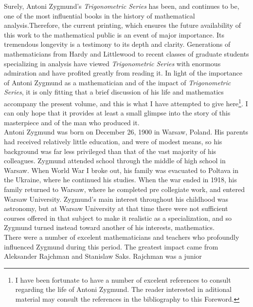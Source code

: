 %
%
Surely, Antoni Zygmund's \textit{Trigonometric Series} has been, and continues to be, one of the most influential 
books in the history of mathematical analysis.Therefore, the current printing, which ensures the future availability of 
this work to the mathematical public is an event of major importance. Its tremendous longevity is a testimony 
to its depth and clarity. Generations of mathematicians from Hardy and Littlewood to recent classes of graduate 
students specializing in analysis have viewed \textit{Trigonometric Series} with enormous admiration and have 
profited greatly from reading it. In light of the importance of Antoni Zygmund as a mathematician and of the 
impact of \textit{Trigonometric Series}, it is only fitting that a brief discussion of his life and mathematics accompany 
the present volume, and this is what I have attempted to give here\footnote[1]{I have been fortunate to have a number of 
excelent references to consult regarding the life of Antoni Zygmund. The reader interested in aditional material 
may consult the references in the bibliography to this Foreword.}. I can only hope that it provides at least 
a small glimpse into the story of this masterpiece and of the man who produced it.\\
\indent Antoni Zygmund was born on December 26, 1900 in Warsaw, Poland. His parents had received relatively 
little education, and were of modest means, so his background was far less privileged than that of the vast majority 
of his colleagues. Zygmund attended school through the middle of high school in Warsaw. When World War I broke 
out, his family was evacuated to Poltava in the Ukraine, where he continued his studies. When the war ended 
in 1918, his family returned to Warsaw, where he completed pre collegiate work, and entered Warsaw University. 
Zygmund's main interest throughout his childhood was astronomy, but at Warsaw University at that time there 
were not sufficient courses offered in that subject to make it realistic as a specialization, and so 
Zygmund turned instead toward another of his interests, mathematics.\\
\indent  There were a number of excelent mathematicians and teachers who profoundly influenced Zygmund during 
this period. The greatest impact came from Aleksander Rajchman and Stanislaw Saks. Rajchman was a junior 

